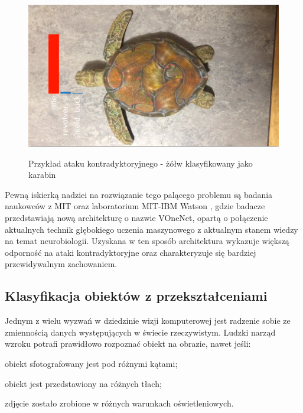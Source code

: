 \begin{figure}[h]
\begin{center}
\includegraphics[width=15cm]{resources/figures/ai-adversarial-attack-turtle.png}
\caption{Przykład ataku kontradyktoryjnego - żółw klasyfikowany jako karabin}
\label{TurtleAdversarialAttack}
\end{center}
\end{figure}

\vspace{-0.5cm}
Pewną iskierką nadziei na rozwiązanie tego palącego problemu są badania naukowców z MIT oraz laboratorium MIT-IBM Watson \cite{cnns:neuroscienceProtection}, gdzie badacze przedstawiają nową architekturę o nazwie VOneNet, opartą o połączenie aktualnych technik głębokiego uczenia maszynowego z aktualnym stanem wiedzy na temat neurobiologii. Uzyskana w ten sposób architektura wykazuje większą odporność na ataki kontradyktoryjne oraz charakteryzuje się bardziej przewidywalnym zachowaniem.

\subsection{Klasyfikacja obiektów z przekształceniami}
Jednym z wielu wyzwań w dziedzinie wizji komputerowej jest radzenie sobie ze zmiennością danych występujących w świecie rzeczywistym. Ludzki narząd wzroku potrafi prawidłowo rozpoznać obiekt na obrazie, nawet jeśli:
\vspace{-0.5cm}
\begin{itemize*}
\item obiekt sfotografowany jest pod różnymi kątami;
\item obiekt jest przedstawiony na różnych tłach;
\item zdjęcie zostało zrobione w różnych warunkach oświetleniowych.
\end{itemize*}

